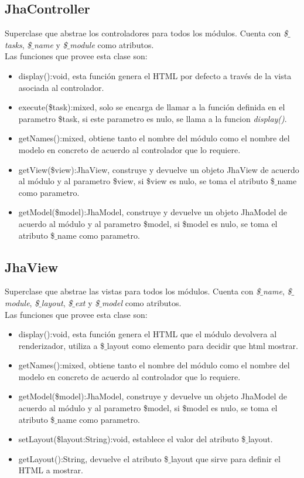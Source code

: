 \subsection{JhaController}
Superclase que abstrae los controladores para todos los m\'odulos. Cuenta con \textit{\$$\_$tasks}, \textit{\$$\_$name} y \textit{\$$\_$module} como atributos.\\
Las funciones que provee esta clase son:
\begin{itemize}
\item \textsf{display():void}, esta funci\'on genera el HTML por defecto a trav\'es de la vista asociada al controlador.
\item \textsf{execute(\$task):mixed}, solo se encarga de llamar a la funci\'on definida en el parametro \$task, si este parametro es nulo, se llama a la funcion \textit{display()}.
\item \textsf{getNames():mixed}, obtiene tanto el nombre del m\'odulo como el nombre del modelo en concreto de acuerdo al controlador que lo requiere.
\item \textsf{getView(\$view):JhaView}, construye y devuelve un objeto JhaView de acuerdo al m\'odulo y al parametro \$view, si \$view es nulo, se toma el atributo \$$\_$name como parametro.
\item \textsf{getModel(\$model):JhaModel}, construye y devuelve un objeto JhaModel de acuerdo al m\'odulo y al parametro \$model, si \$model es nulo, se toma el atributo \$$\_$name como parametro.
\end{itemize}

\subsection{JhaView}
Superclase que abstrae las vistas para todos los m\'odulos. Cuenta con \textit{\$$\_$name}, \textit{\$$\_$module}, \textit{\$$\_$layout}, \textit{\$$\_$ext} y \textit{\$$\_$model} como atributos.\\
Las funciones que provee esta clase son:
\begin{itemize}
\item \textsf{display():void}, esta funci\'on genera el HTML que el m\'odulo devolvera al renderizador, utiliza a \$$\_$layout como elemento para decidir que html mostrar.
\item \textsf{getNames():mixed}, obtiene tanto el nombre del m\'odulo como el nombre del modelo en concreto de acuerdo al controlador que lo requiere.
\item \textsf{getModel(\$model):JhaModel}, construye y devuelve un objeto JhaModel de acuerdo al m\'odulo y al parametro \$model, si \$model es nulo, se toma el atributo \$$\_$name como parametro.
\item \textsf{setLayout(\$layout:String):void}, establece el valor del atributo \$$\_$layout.
\item \textsf{getLayout():String}, devuelve el atributo \$$\_$layout que sirve para definir el HTML a mostrar.
\end{itemize}

